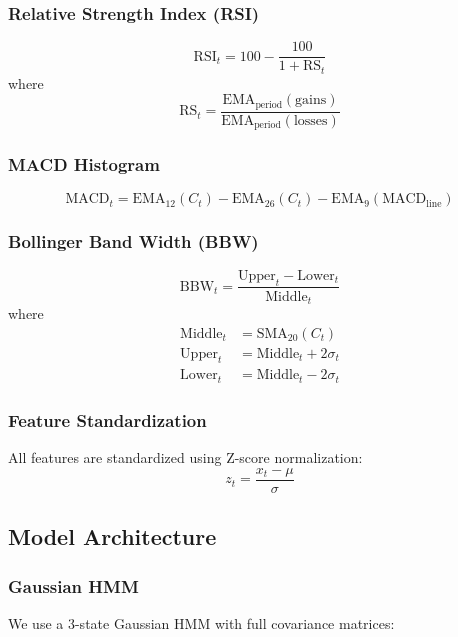 \documentclass[conference]{IEEEtran}
\begin{document}
\subsubsection{Relative Strength Index (RSI)}
\begin{equation}
\text{RSI}_t = 100 - \frac{100}{1 + \text{RS}_t}
\end{equation}
where
\begin{equation}
\text{RS}_t = \frac{\text{EMA}_{\text{period}}(\text{gains})}{\text{EMA}_{\text{period}}(\text{losses})}
\end{equation}

\subsubsection{MACD Histogram}
\begin{equation}
\text{MACD}_t = \text{EMA}_{12}(C_t) - \text{EMA}_{26}(C_t) - \text{EMA}_{9}(\text{MACD}_{\text{line}})
\end{equation}

\subsubsection{Bollinger Band Width (BBW)}
\begin{equation}
\text{BBW}_t = \frac{\text{Upper}_t - \text{Lower}_t}{\text{Middle}_t}
\end{equation}
where
\begin{align}
\text{Middle}_t &= \text{SMA}_{20}(C_t) \\
\text{Upper}_t &= \text{Middle}_t + 2\sigma_t \\
\text{Lower}_t &= \text{Middle}_t - 2\sigma_t
\end{align}

\subsubsection{Feature Standardization}
All features are standardized using Z-score normalization:
\begin{equation}
z_t = \frac{x_t - \mu}{\sigma}
\end{equation}

\subsection{Model Architecture}

\subsubsection{Gaussian HMM}
We use a 3-state Gaussian HMM with full covariance matrices:
\end{document}
